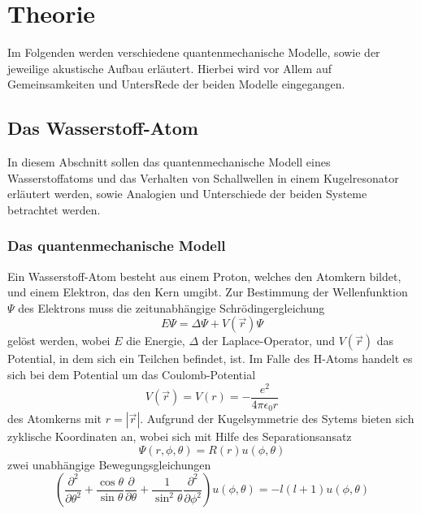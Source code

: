 \section{Theorie}
Im Folgenden werden verschiedene quantenmechanische Modelle, sowie der jeweilige akustische Aufbau erläutert. Hierbei wird vor Allem auf Gemeinsamkeiten und UntersRede der beiden Modelle eingegangen.

\subsection{Das Wasserstoff-Atom}
In diesem Abschnitt sollen das quantenmechanische Modell eines Wasserstoffatoms und das Verhalten von Schallwellen in einem Kugelresonator erläutert werden, sowie Analogien und Unterschiede der beiden Systeme betrachtet werden.
\subsubsection{Das quantenmechanische Modell}
Ein Wasserstoff-Atom besteht aus einem Proton, welches den Atomkern bildet, und einem Elektron, das den Kern umgibt. Zur Bestimmung der Wellenfunktion $\Psi$ des Elektrons muss die zeitunabhängige Schrödingergleichung
\begin{equation}
  E \Psi = \Delta \Psi + V \left( \vec{r} \right) \Psi
\end{equation}
gelöst werden, wobei $E$ die Energie, $\Delta$ der Laplace-Operator, und $V \left( \vec{r} \right)$ das Potential, in dem sich ein Teilchen befindet, ist. Im Falle des H-Atoms handelt es sich bei dem Potential um das Coulomb-Potential
\begin{equation}
  V \left( \vec{r} \right) = V \left( r \right) = - \frac{e^2}{4\pi \epsilon_0 r}
\end{equation}
des Atomkerns mit $r = |\vec{r}|$.
Aufgrund der Kugelsymmetrie des Sytems bieten sich zyklische Koordinaten an, wobei sich mit Hilfe des Separationsansatz
\begin{equation}
  \Psi \left( r, \phi, \theta \right) = R\left( r \right) u \left( \phi, \theta \right)
\end{equation}
zwei unabhängige Bewegungsgleichungen
\begin{equation}
  \left( \frac{\partial^2}{\partial \theta^2} + \frac{\cos \theta}{\sin \theta} \frac{\partial}{\partial \theta} + \frac{1}{\sin^2 \theta} \frac{\partial^2}{\partial \phi^2} \right) u \left( \phi, \theta \right) = -l \left( l + 1 \right) u \left( \phi, \theta \right)
\end{equation}

